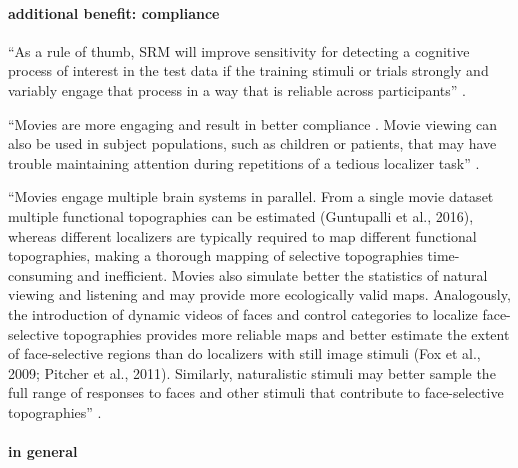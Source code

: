 \paragraph{additional benefit: compliance}
%
``As a rule of thumb, SRM will improve sensitivity for detecting a cognitive
process of interest in the test data if the training stimuli or trials strongly
and variably engage that process in a way that is reliable across participants''
\citep{cohen2017computational}.

%
``Movies are more engaging and result in better compliance
\citep{vanderwal2015inscapes}. Movie viewing can also be used in subject
populations, such as children \citep{richardson2018development} or patients,
that may have trouble maintaining attention during repetitions of a tedious
localizer task'' \citep{jiahui2020predicting}.

%
``Movies engage multiple brain systems in parallel. From a single movie dataset
multiple functional topographies can be estimated (Guntupalli et al., 2016),
whereas different localizers are typically required to map different functional
topographies, making a thorough mapping of selective topographies
time-consuming and inefficient. Movies also simulate better the statistics of
natural viewing and listening and may provide more ecologically valid maps.
Analogously, the introduction of dynamic videos of faces and control categories
to localize face-selective topographies provides more reliable maps and better
estimate the extent of face-selective regions than do localizers with still
image stimuli (Fox et al., 2009; Pitcher et al., 2011). Similarly, naturalistic
stimuli may better sample the full range of responses to faces and other stimuli
that contribute to face-selective topographies'' \citep{jiahui2020predicting}.

\paragraph{in general}

